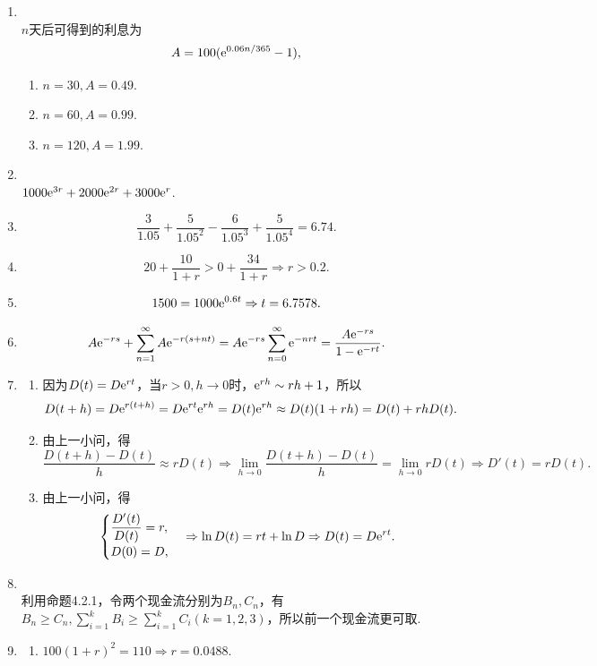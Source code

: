 \begin{enumerate}[label=\arabic{section}.\arabic*]
    \item \sol\\
    $n$天后可得到的利息为
    \[A=100(\mathrm{e}^{0.06n/365}-1),\]
    \begin{enumerate}[label=\alph*)]
        \item $n = 30, A = 0.49$.
        \item $n = 60, A = 0.99$.
        \item $n = 120, A = 1.99$.
    \end{enumerate}
    \item \sol\\
    $1000\mathrm{e}^{3r}+2000\mathrm{e}^{2r}+3000\mathrm{e}^{r}$.
    \item \sol \[\frac{3}{1.05}+\frac{5}{1.05^2}-\frac{6}{1.05^3}+\frac{5}{1.05^4}=6.74.\]
    \item \sol \[20+\frac{10}{1+r}>0+\frac{34}{1+r} \Rightarrow r>0.2.\]
    \item \sol \[1500=1000\mathrm{e}^{0.6t} \Rightarrow t=6.7578.\]
    \item \sol \[A\mathrm{e}^{-rs}+\sum_{n=1}^{\infty} A\mathrm{e}^{-r(s+nt)}=A\mathrm{e}^{-rs}\sum_{n=0}^{\infty} \mathrm{e}^{-nrt}=\frac{A\mathrm{e}^{-rs}}{1-\mathrm{e}^{-rt}}.\]
    \item \pro
    \begin{enumerate}[label=\alph*)]
        \item 因为$D(t)=D\mathrm{e}^{rt}$，当$r>0, h \to 0$时，$\mathrm{e}^{rh} \sim rh+1$，所以
        \[D(t+h)=D\mathrm{e}^{r(t+h)}=D\mathrm{e}^{rt}\mathrm{e}^{rh} = D(t)\mathrm{e}^{rh} \approx D(t)(1+rh)=D(t)+rhD(t).\]
        \item 由上一小问，得
        \[\frac{D(t+h)-D(t)}{h} \approx rD(t) \Rightarrow \lim_{h \to 0}\frac{D(t+h)-D(t)}{h} = \lim_{h \to 0}rD(t) \Rightarrow D'(t)=rD(t).\]
        \item 由上一小问，得
        \[\begin{cases}
            \displaystyle\frac{D'(t)}{D(t)}=r,\\D(0)=D,
        \end{cases} \Rightarrow \ln D(t)=rt+\ln D \Rightarrow D(t)=D\mathrm{e}^{rt}.\]
    \end{enumerate}
    \item \sol\\
    利用命题4.2.1，令两个现金流分别为$B_n,C_n$，有$B_n \geq C_n, \displaystyle \sum_{i=1}^k B_i \geq \sum_{i=1}^k C_i(k=1,2,3)$，所以前一个现金流更可取.
    \item \sol
    \begin{enumerate}[label=\alph*)]
        \item $100(1+r)^2=110 \Rightarrow r=0.0488$.

\end{enumerate}
\end{enumerate}
